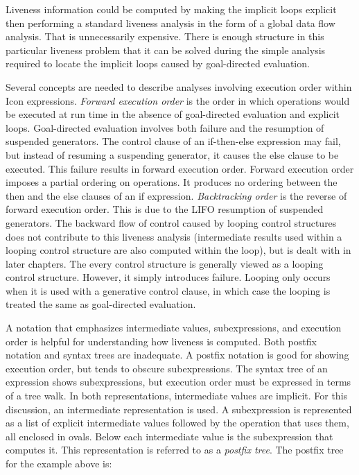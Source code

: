 Liveness information could be computed by making the implicit loops
explicit then performing a standard liveness analysis in the form of a
global data flow analysis. That is unnecessarily expensive. There is
enough structure in this particular liveness problem that it can be
solved during the simple analysis required to locate the implicit
loops caused by goal-directed evaluation.

Several concepts are needed to describe analyses involving execution
order within Icon expressions. \textit{Forward execution order} is the
order in which operations would be executed at run time in the absence
of goal-directed evaluation and explicit loops. Goal-directed
evaluation involves both failure and the resumption of suspended
generators. The control clause of an if-then-else expression may fail,
but instead of resuming a suspending generator, it causes the else
clause to be executed. This failure results in forward execution
order. Forward execution order imposes a partial ordering on
operations. It produces no ordering between the then and the else
clauses of an if expression. \textit{Backtracking order} is the
reverse of forward execution order. This is due to the LIFO resumption
of suspended generators. The backward flow of control caused by
looping control structures does not contribute to this liveness
analysis (intermediate results used within a looping control structure
are also computed within the loop), but is dealt with in later
chapters. The every control structure is generally viewed as a looping
control structure.  However, it simply introduces failure. Looping
only occurs when it is used with a generative control clause, in which
case the looping is treated the same as goal-directed evaluation.

A notation that emphasizes intermediate values, subexpressions, and
execution order is helpful for understanding how liveness is
computed. Both postfix notation and syntax trees are inadequate. A
postfix notation is good for showing execution order, but tends to
obscure subexpressions. The syntax tree of an expression shows
subexpressions, but execution order must be expressed in terms of a
tree walk. In both representations, intermediate values are implicit.
For this discussion, an intermediate representation is used. A
subexpression is represented as a list of explicit intermediate values
followed by the operation that uses them, all enclosed in ovals. Below
each intermediate value is the subexpression that computes it. This
representation is referred to as a \textit{postfix tree}. The postfix
tree for the example above is:

